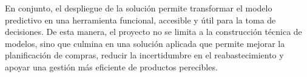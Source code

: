 En conjunto, el despliegue de la solución permite transformar el modelo predictivo en una herramienta funcional, accesible y útil para la toma de decisiones. De esta manera, el proyecto no se limita a la construcción técnica de modelos, sino que culmina en una solución aplicada que permite mejorar la planificación de compras, reducir la incertidumbre en el reabastecimiento y apoyar una gestión más eficiente de productos perecibles.